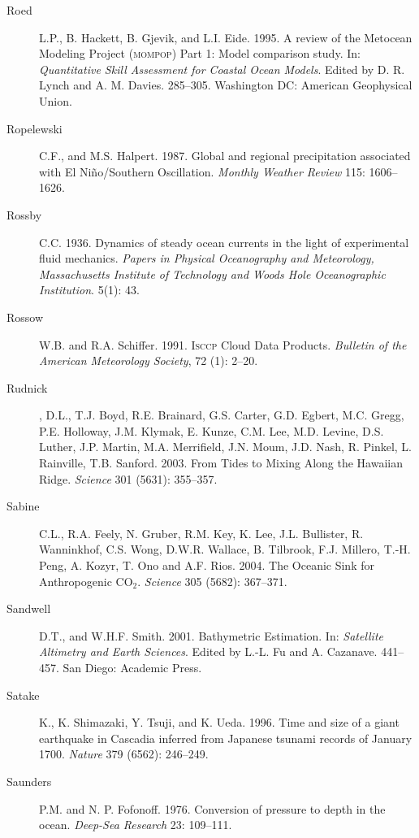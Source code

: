 \begin{description}
\item [Roed]L.P., B. Hackett, B. Gjevik, and L.I. Eide. 1995. A review of the Metocean Modeling Project (\textsc{mompop}) Part 1: Model comparison study. In: \textit{Quantitative Skill Assessment for Coastal Ocean Models}. Edited by D. R. Lynch and A. M. Davies. 285--305. Washington DC: American Geophysical Union.

\item [Ropelewski]C.F., and M.S. Halpert. 1987. Global and regional precipitation associated with El Ni\~{n}o/Southern Oscillation. \textit{Monthly Weather Review} 115: 1606--1626.

\item [Rossby]C.C. 1936. Dynamics of steady ocean currents in the light of experimental fluid mechanics. \textit{Papers in Physical Oceanography and Meteorology, Massachusetts Institute of Technology and Woods Hole Oceanographic Institution}. 5(1): 43.

\item [Rossow]W.B. and R.A. Schiffer. 1991. \textsc{Isccp} Cloud Data Products. \textit{Bulletin of the  American Meteorology Society}, 72 (1): 2--20.

\item [Rudnick], D.L., T.J. Boyd, R.E. Brainard, G.S. Carter, G.D. Egbert, M.C. Gregg, P.E. Holloway, J.M. Klymak, E. Kunze, C.M. Lee, M.D. Levine, D.S. Luther, J.P. Martin, M.A. Merrifield, J.N. Moum, J.D. Nash, R. Pinkel, L. Rainville, T.B. Sanford. 2003. From Tides to Mixing Along the Hawaiian Ridge. \textit{Science}  301 (5631): 355--357.

\item [Sabine]C.L., R.A. Feely, N. Gruber, R.M. Key, K. Lee, J.L. Bullister, R. Wanninkhof, C.S. Wong, D.W.R. Wallace, B. Tilbrook, F.J. Millero, T.-H. Peng, A. Kozyr, T. Ono and A.F. Rios. 2004. The Oceanic Sink for Anthropogenic CO$_2$. \textit{Science} 305 (5682): 367--371.

\item [Sandwell]D.T., and W.H.F. Smith. 2001. Bathymetric Estimation. In: \textit{Satellite Altimetry and Earth Sciences}. Edited by L.-L. Fu and A. Cazanave. 441--457. San Diego: Academic Press.

\item [Satake]K., K. Shimazaki, Y. Tsuji, and K. Ueda. 1996. Time and size of a
giant earthquake in Cascadia inferred from Japanese tsunami records of January
1700. \textit{Nature} 379 (6562): 246--249.

\item [Saunders]P.M. and N. P. Fofonoff. 1976. Conversion of pressure to
depth in the ocean. \textit{Deep-Sea Research} 23: 109--111.


\end{description}
